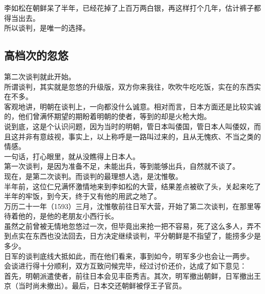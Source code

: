 \begin{multicols}{\theparacolNo}
李如松在朝鲜呆了半年，已经花掉了上百万两白银，再这样打个几年，估计裤子都得当出去。\\

所以谈判，是唯一的选择。\\

\subsection{高档次的忽悠}
第二次谈判就此开始。\\

所谓谈判，其实就是忽悠的升级版，双方你来我往，吹吹牛吃吃饭，实在的东西实在不多。\\

客观地讲，明朝在谈判上，一向都没什么诚意。相对而言，日本方面还是比较实诚的，他们曾满怀期望的期盼着明朝的使者，等到的却是火枪大炮。\\

说到底，这是个认识问题，因为当时的明朝，管日本叫倭国，管日本人叫倭奴，而且这并非有意歧视，事实上，以上称呼是一路叫过来的，且从无愧疚、不当之类的情感。\\

一句话，打心眼里，就从没瞧得上日本人。\\

第一次谈判，是因为准备不足，未能出兵，等到能够出兵，自然就不谈了。\\

现在，是第二次谈判。而谈判的最理想人选，是沈惟敬。\\

半年前，这位仁兄满怀激情地来到李如松的大营，结果差点被砍了头，关起来吃了半年的牢饭，到今天，终于又有他的用武之地了。\\

万历二十一年（1593）三月，沈惟敬前往日军大营，开始了第二次谈判，在那里等待着他的，是他的老朋友小西行长。\\

虽然之前曾被无情地忽悠过一次，但毕竟出来抢一把不容易，死了这么多人，弄不到点实在东西也没法回去，日方决定继续谈判，平分朝鲜是不指望了，能捞多少是多少。\\

日军的谈判底线大抵如此，而在他们看来，事到如今，明军多少也会让一两步。\\

会谈进行得十分顺利，双方互致问候完毕，经过讨价还价，达成了如下意见：\\

首先，明朝派遣使者，前往日本会见丰臣秀吉。其次，明军撤出朝鲜，日军撤出王京（当时尚未撤出）。最后，日本交还朝鲜被俘王子官员。\\


\end{multicols}

